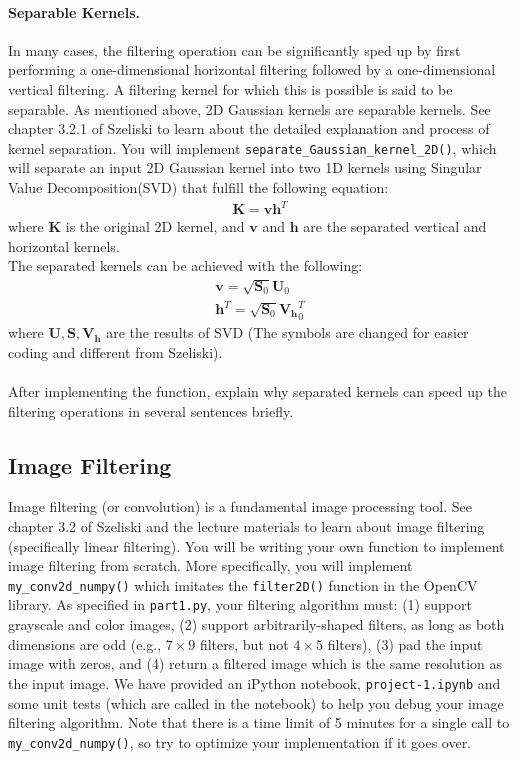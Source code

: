\documentclass{article}
\begin{document}
\paragraph{Separable Kernels.} In many cases, the filtering operation can be significantly sped up by first performing a one-dimensional horizontal filtering followed by a one-dimensional vertical filtering. A filtering kernel for which this is possible is said to be separable. As mentioned above, 2D Gaussian kernels are separable kernels. See chapter 3.2.1 of Szeliski to learn about the detailed explanation and process of kernel separation. You will implement \lstinline{separate_Gaussian_kernel_2D()}, which will separate an input 2D Gaussian kernel into two 1D kernels using Singular Value Decomposition(SVD) that fulfill the following equation:
\begin{align}
    \mathbf{K} = \mathbf{v} \mathbf{h}^T
\end{align}
\noindent
where $\mathbf{K}$ is the original 2D kernel, and $\mathbf{v}$ and $\mathbf{h}$ are the separated vertical and horizontal kernels.
\\
\noindent
The separated kernels can be achieved with the following:
\begin{align}
    \mathbf{v} = \sqrt{\mathbf{S}_0} \mathbf{U}_0 \\
    \mathbf{h}^T = \sqrt{\mathbf{S}_0} \mathbf{V_h}_0^T
\end{align}
\noindent
where $\mathbf{U}, \mathbf{S}, \mathbf{V_h}$ are the results of SVD (The symbols are changed for easier coding and different from Szeliski).
\\
\\
\noindent
After implementing the function, explain why separated kernels can speed up the filtering operations in several sentences briefly.

\subsection{Image Filtering}
Image filtering (or convolution) is a fundamental image processing tool. See chapter 3.2 of Szeliski and the lecture materials to learn about image filtering (specifically linear filtering). You will be writing your own function to implement image filtering from scratch. More specifically, you will implement \lstinline{my_conv2d_numpy()} which imitates the \lstinline{filter2D()} function in the OpenCV library. As specified in \lstinline{part1.py}, your filtering algorithm must: (1) support grayscale and color images, (2) support arbitrarily-shaped filters, as long as both dimensions are odd (e.g., $7\times9$ filters, but not $4\times5$ filters), (3) pad the input image with zeros, and (4) return a filtered image which is the same resolution as the input image. We have provided an iPython notebook, \lstinline{project-1.ipynb} and some unit tests (which are called in the notebook) to help you debug your image filtering algorithm. Note that there is a time limit of 5 minutes for a single call to \lstinline{my_conv2d_numpy()}, so try to optimize your implementation if it goes over.
\end{document}
